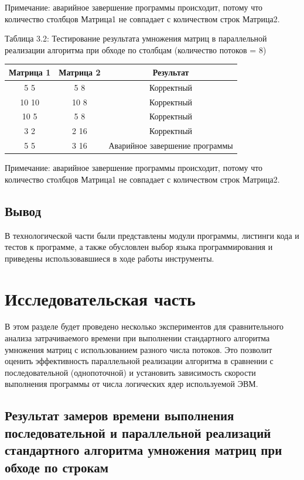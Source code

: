 \documentclass[12pt]{report}
\begin{document}
Примечание: аварийное завершение программы происходит, потому что количество столбцов Матрица1 не совпадает с количеством строк Матрица2.

\begin{center}
	\centering
	\caption{Таблица 3.2: Тестирование результата умножения матриц в параллельной реализации алгоритма при обходе по столбцам (количество потоков = 8)}
	\begin{tabular}{|c c c|}
		\hline
		Матрица 1 & Матрица 2 &  Результат \\ [0.5ex] 
 		\hline\hline
		5 5 & 5 8 & Корректный\\
 		\hline
 		10 10 & 10 8 & Корректный\\
		\hline
		10 5 & 5 8 & Корректный\\
 		\hline
 		 3 2 & 2 16 & Корректный\\
 		\hline
		5 5 & 3 16 & Аварийное завершение программы\\
		\hline
	\end{tabular}
\end{center} 

Примечание: аварийное завершение программы происходит, потому что количество столбцов Матрица1 не совпадает с количеством строк Матрица2.


\section{Вывод}
В технологической части были представлены модули программы, листинги кода и тестов к программе, а также обусловлен выбор языка программирования и приведены использовавшиеся в ходе работы инструменты.

\chapter{Исследовательская часть}

В этом разделе будет проведено несколько экспериментов для сравнительного анализа затрачиваемого времени при выполнении стандартного алгоритма умножения матриц с использованием разного числа потоков. Это позволит оценить эффективность параллельной реализации алгоритма в сравнении с последовательной (однопоточной) и установить зависимость скорости выполнения программы от числа логических ядер используемой ЭВМ.


\section{Результат замеров времени выполнения последовательной и параллельной реализаций стандартного алгоритма умножения матриц при обходе по строкам} 
\end{document}
